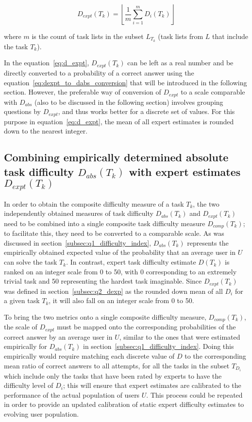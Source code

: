 \begin{equation} \label{eq:d_expt}
    D_{expt}(T_k) = \left \lfloor \frac{1} {m} \sum \limits_{i=1}^m D_i(T_k) \right \rfloor
\end{equation}

where $m$ is the count of task lists in the subset $L_{T_k}$ (task lists from $L$ that include the task $T_k$).

In the equation~\ref{eq:d_expt}, $D_{expt}(T_k)$ can be left as a real number and be directly converted to a probability of a correct answer using the equation~\ref{eq:dexpt_to_dabs_conversion} that will be introduced in the following section.
However, the preferable way of conversion of $D_{expt}$ to a scale comparable with $D_{abs}$ (also to be discussed in the following section) involves grouping questions by $D_{expt}$, and thus works better for a discrete set of values.
For this purpose in equation~\ref{eq:d_expt}, the mean of all expert estimates is rounded down to the nearest integer.

\subsection{Combining empirically determined absolute task difficulty $D_{abs}(T_k)$ with expert estimates $D_{expt}(T_k)$} \label{subsec:q2_dcomp}

In order to obtain the composite difficulty measure of a task $T_k$, the two independently obtained measures of task difficulty $D_{abs}(T_k)$ and $D_{expt}(T_k)$ need to be combined into a single composite task difficulty measure $D_{comp}(T_k)$;
to facilitate this, they need to be converted to a comparable scale.
As was discussed in section~\ref{subsec:q1_difficulty_index}, $D_{abs}(T_k)$ represents the empirically obtained expected value of the probability that an average user in $U$ can solve the task $T_k$.
In contrast, expert task difficulty estimate $D(T_k)$ is ranked on an integer scale from 0 to 50, with 0 corresponding to an extremely trivial task and 50 representing the hardest task imaginable.
Since $D_{expt}(T_k)$ was defined in section~\ref{subsec:q2_dexp} as the rounded down mean of all $D_i$ for a given task $T_k$, it will also fall on an integer scale from 0 to 50.

To bring the two metrics onto a single composite difficulty measure, $D_{comp}(T_k)$, the scale of $D_{expt}$ must be mapped onto the corresponding probabilities of the correct answer by an average user in $U$, similar to the ones that were estimated empirically for $D_{abs}(T_k)$ in section~\ref{subsec:q1_difficulty_index}.
Doing this empirically would require matching each discrete value of $D$ to the corresponding mean ratio of correct answers to all attempts, for all the tasks in the subset $T_{D_i}$ which include only the tasks that have been rated by experts to have the difficulty level of $D_i$;
this will ensure that expert estimates are calibrated to the performance of the actual population of users $U$.
This process could be repeated in order to provide an updated calibration of static expert difficulty estimates to evolving user population.

